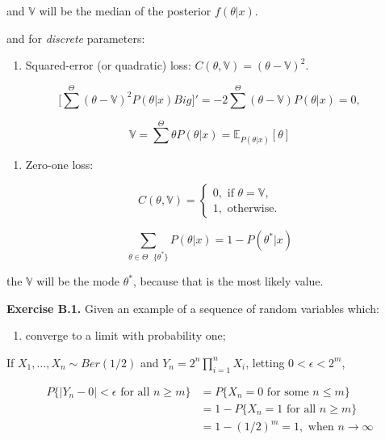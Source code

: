 \documentclass[]{article}
\providecommand{\tightlist}{%
  \setlength{\itemsep}{0pt}\setlength{\parskip}{0pt}}
\begin{document}
and \(\mathbb{V}\) will be the median of the posterior
\(f(\theta | x)\).

and for \emph{discrete} parameters:

\begin{enumerate}
\def\labelenumi{(\alph{enumi})}
\setcounter{enumi}{2}
\tightlist
\item
  Squared-error (or quadratic) loss:
  \(C(\theta, \mathbb{V}) = (\theta - \mathbb{V})^2\).
\end{enumerate}

\[\Big[\sum^{\Theta} (\theta - \mathbb{V})^2 P(\theta | x)Big]' = -2 \sum^{\Theta}(\theta - \mathbb{V}) P(\theta | x) = 0,\]

\[\mathbb{V} = \sum^{\Theta}\theta P(\theta | x) = \mathbb{E}_{P(\theta |x)}[\theta]\]

\begin{enumerate}
\def\labelenumi{(\alph{enumi})}
\setcounter{enumi}{3}
\tightlist
\item
  Zero-one loss:
\end{enumerate}

\[
C(\theta, \mathbb{V})  = 
\begin{cases}
    0,\text{ if }\theta = \mathbb{V}, \\
    1,\text{ otherwise.} 
\end{cases}
\]

\[\sum_{\theta \in \Theta \texttt{\ } \{\theta^*\}} P(\theta | x) 
= 1 - P(\theta^* | x)\]

the \(\mathbb{V}\) will be the mode \(\theta^*\), because that is the
most likely value.

\textbf{Exercise B.1.} Given an example of a sequence of random
variables which:

\begin{enumerate}
\def\labelenumi{(\alph{enumi})}
\tightlist
\item
  converge to a limit with probability one;
\end{enumerate}

If \(X_1,\dots,X_n \sim Ber(1/2)\) and
\(Y_n = 2^n \prod_{i = 1}^n X_i\), letting \(0 < \epsilon < 2^m\),

\[
\begin{split}
 P\{|Y_n - 0| < \epsilon \text{ for all } n \geq m\} & = 
P\{X_n = 0 \text{ for some } n \leq m \} \\
& = 1 - P\{X_n = 1\text{ for all }  n \geq m \} \\
& = 1 - (1/2)^m = 1, \text{ when } n \to \infty
\end{split}
\]
\end{document}
